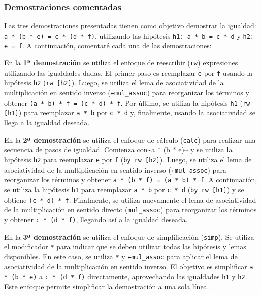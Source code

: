 \subsubsection{Demostraciones comentadas}

Las tres demostraciones presentadas tienen como objetivo demostrar la
igualdad: \texttt{a * (b * e) = c * (d * f)}, utilizando las hipótesis
\texttt{h1: a * b = c * d} y \texttt{h2: e = f}. A continuación, comentaré cada una de
las demostraciones:

En la \textbf{1ª demostración} se utiliza el enfoque de reescribir (\texttt{rw})
expresiones utilizando las igualdades dadas. El primer paso es reemplazar
\texttt{e} por \texttt{f} usando la hipótesis \texttt{h2} (\texttt{rw [h2]}). Luego, se utiliza el
lema de asociatividad de la multiplicación en sentido inverso
(\texttt{←mul\_assoc}) para reorganizar los términos y obtener
\texttt{(a * b) * f = (c * d) * f}. Por último, se utiliza la hipótesis
\texttt{h1} (\texttt{rw [h1]}) para reemplazar \texttt{a * b} por \texttt{c * d} y, finalmente,
usando la asociatividad se llega a la igualdad deseada.

En la \textbf{2ª demostración} se utiliza el enfoque de cálculo (\texttt{calc}) para
realizar una secuencia de pasos de igualdad. Comienza con\textasciitilde{}a * (b * e)\textasciitilde{}
y se utiliza la hipótesis \texttt{h2} para reemplazar \texttt{e} por \texttt{f}
(\texttt{by rw [h2]}). Luego, se utiliza el lema de asociatividad de la
multiplicación en sentido inverso (\texttt{←mul\_assoc}) para reorganizar los
términos y obtener \texttt{a * (b * f) = (a * b) * f}. A continuación, se
utiliza la hipótesis \texttt{h1} para reemplazar \texttt{a * b} por
\texttt{c * d} (\texttt{by rw [h1]}) y se obtiene \texttt{(c * d) * f}. Finalmente, se
utiliza nuevamente el lema de asociatividad de la multiplicación en
sentido directo (\texttt{mul\_assoc}) para reorganizar los términos y obtener
\texttt{c * (d * f)}, llegando así a la igualdad deseada.

En la \textbf{3ª demostración} se utiliza el enfoque de simplificación
(\texttt{simp}). Se utiliza el modificador \texttt{*} para indicar que se deben
utilizar todas las hipótesis y lemas disponibles. En este caso, se
utiliza \texttt{*} y \texttt{←mul\_assoc} para aplicar el lema de asociatividad de la
multiplicación en sentido inverso. El objetivo es simplificar
\texttt{a * (b * e)} a \texttt{c * (d * f)} directamente, aprovechando las igualdades
\texttt{h1} y \texttt{h2}. Este enfoque permite simplificar la demostración a una sola
línea.


